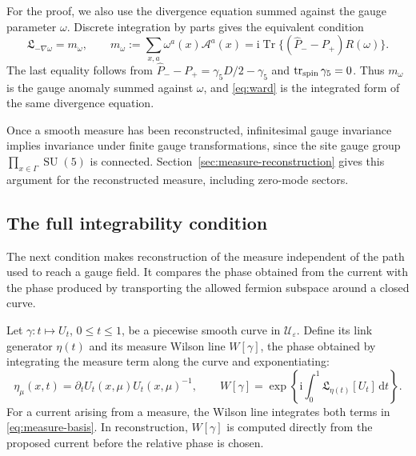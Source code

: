 \documentclass[11pt,a4paper]{article}
\theoremstyle{remark}
\DeclareMathOperator{\Tr}{Tr}
\DeclareMathOperator{\tr}{tr}
\DeclareMathOperator{\SU}{SU}
\newcommand{\dd}{\mathrm d}
\newcommand{\ii}{\mathrm i}
\newcommand{\eps}{\varepsilon}
\begin{document}
For the proof, we also use the divergence equation summed against
the gauge parameter \(\omega\). Discrete integration by parts
gives the equivalent condition
\begin{equation}
 \mathfrak L_{-\nabla\omega}=m_\omega,
 \qquad
 m_\omega:=\sum_{x,a}\omega^a(x)\mathcal A^a(x)
 =\ii\Tr\{(\widehat P_--P_+)R(\omega)\}.
 \label{eq:ward}
\end{equation}
The last equality follows from
\(\widehat P_--P_+=\gamma_5D/2-\gamma_5\) and
\(\tr_{\rm spin}\gamma_5=0\). Thus \(m_\omega\) is the gauge
anomaly summed against \(\omega\), and \eqref{eq:ward} is
the integrated form of the same divergence equation.

Once a smooth measure has been reconstructed, infinitesimal
gauge invariance implies invariance under finite gauge
transformations, since the site gauge group
\(\prod_{x\in\Gamma}\SU(5)\) is connected.
Section~\ref{sec:measure-reconstruction} gives this argument
for the reconstructed measure, including zero-mode sectors.

\subsection{The full integrability condition}

The next condition makes reconstruction of the measure
independent of the path used to reach a gauge field.
It compares the phase obtained from the current with
the phase produced by transporting the allowed fermion
subspace around a closed curve.

Let \(\gamma:t\mapsto U_t\), \(0\le t\le1\), be a
piecewise smooth curve in \(\mathcal U_\eps\). Define its
link generator \(\eta(t)\) and its measure Wilson line
\(W[\gamma]\), the phase obtained by integrating the measure
term along the curve and exponentiating:
\begin{equation}
 \eta_\mu(x,t)=\partial_tU_t(x,\mu)U_t(x,\mu)^{-1},
 \qquad
 W[\gamma]=\exp\left\{\ii\int_0^1
                         \mathfrak L_{\eta(t)}[U_t]\,\dd t\right\}.
 \label{eq:measure-wilson-line}
\end{equation}
For a current arising from a measure, the Wilson line
integrates both terms in \eqref{eq:measure-basis}.
In reconstruction, \(W[\gamma]\) is computed directly
from the proposed current before the relative phase
is chosen.
\end{document}
